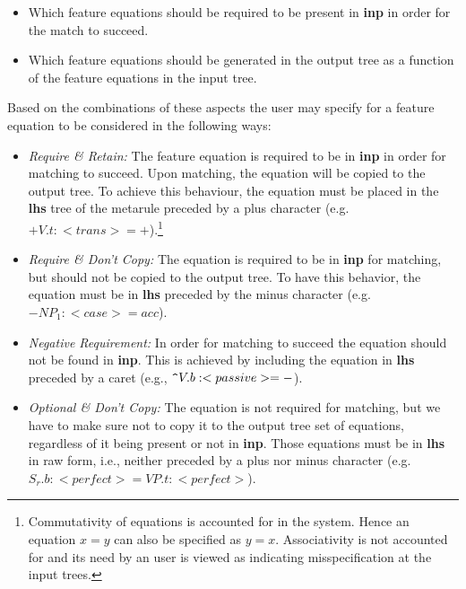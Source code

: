 \begin{itemize} 
\item   Which feature equations should be required to be present in {\bf inp} 
        in order for the match to succeed. 
 
\item   Which feature equations should be generated in the output tree as a 
        function of the feature equations in the input tree. 
\end{itemize} 
 
Based on the combinations of these aspects the user may specify for a feature 
equation to be considered in the following ways: 
 
\begin{itemize} 
\item   {\it Require \& Retain:} The feature equation 
        is required to be in {\bf inp} in order for matching to succeed. 
        Upon matching, the equation will be copied to the output tree. 
        To achieve this behaviour, the equation must be placed in 
        the {\bf lhs} tree of the metarule preceded by a plus character 
        (e.g. $+V.t:<trans>=+$).\footnote{Commutativity of equations is         accounted for in the system. Hence an equation $x=y$ can also be         specified as $y=x$. Associativity is not accounted for and its need by         an user is viewed as indicating misspecification at the input trees.} 
        
\item   {\it Require \& Don't Copy:} The equation is required to be in 
        {\bf inp} 
        for matching, but should not be copied to the output tree. 
        To have this behavior, the equation must be in {\bf lhs} preceded 
	by the minus character 
        (e.g. $-NP_1:<case>=acc$). 
 
\item	{\it Negative Requirement:} In order for matching to succeed the 
	equation should not be found in {\bf inp}. This is achieved by 
	including the equation in {\bf lhs} preceded by a caret 
	(e.g., $\verb|^|V.b:<passive>=-$). 
 
\item   {\it Optional \& Don't Copy:} 
        The equation is not required for matching, 
        but we have to make sure not to copy it to the output tree set of 
        equations, regardless of it being present or not in {\bf inp}. 
        Those equations must be in {\bf lhs} in raw form, i.e., neither preceded 
        by a plus nor minus character 
        (e.g. $S_r.b:<perfect>=VP.t:<perfect>$). 
 

\end{itemize}
